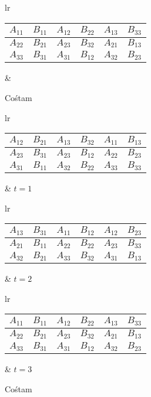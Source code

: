 
\begin{figure}[h]
\centering
\begin{tabular}{lr}
\begin{tabular}{|cc|cc|cc|}
\hline
\(A_{11}\) & \(B_{11}\) & \(A_{12}\) & \(B_{22}\) & \(A_{13}\) & \(B_{33}\) \\
\hline
\(A_{22}\) & \(B_{21}\) & \(A_{23}\) & \(B_{32}\) & \(A_{21}\) & \(B_{13}\) \\
\hline
\(A_{33}\) & \(B_{31}\) & \(A_{31}\) & \(B_{12}\) & \(A_{32}\) & \(B_{23} \) \\
\hline
\end{tabular} &
\hspace{1cm}
\end{tabular}
\caption{Cośtam}
\end{figure}


\begin{figure}[H]
\centering
\begin{tabular}{lr}
\begin{tabular}{|cc|cc|cc|}
\hline
\(A_{12}\) & \(B_{21}\) & \(A_{13}\) & \(B_{32}\) & \(A_{11}\) & \(B_{13}\) \\
\hline
\(A_{23}\) & \(B_{31}\) & \(A_{23}\) & \(B_{12}\) & \(A_{22}\) & \(B_{23}\) \\
\hline
\(A_{31}\) & \(B_{11}\) & \(A_{32}\) & \(B_{22}\) & \(A_{33}\) & \(B_{33} \) \\
\hline
\end{tabular} &
\hspace{1cm}\(t=1\)
\end{tabular}
\vspace{0.5cm}

\begin{tabular}{lr}
\begin{tabular}{|cc|cc|cc|}
\hline
\(A_{13}\) & \(B_{31}\) & \(A_{11}\) & \(B_{12}\) & \(A_{12}\) & \(B_{23}\) \\
\hline
\(A_{21}\) & \(B_{11}\) & \(A_{22}\) & \(B_{22}\) & \(A_{23}\) & \(B_{33}\) \\
\hline
\(A_{32}\) & \(B_{21}\) & \(A_{33}\) & \(B_{32}\) & \(A_{31}\) & \(B_{13} \) \\
\hline
\end{tabular} &
\hspace{1cm}\(t=2\)
\end{tabular}
\vspace{0.5cm}

\begin{tabular}{lr}
\begin{tabular}{|cc|cc|cc|}
\hline
\(A_{11}\) & \(B_{11}\) & \(A_{12}\) & \(B_{22}\) & \(A_{13}\) & \(B_{33}\) \\
\hline
\(A_{22}\) & \(B_{21}\) & \(A_{23}\) & \(B_{32}\) & \(A_{21}\) & \(B_{13}\) \\
\hline
\(A_{33}\) & \(B_{31}\) & \(A_{31}\) & \(B_{12}\) & \(A_{32}\) & \(B_{23} \) \\
\hline
\end{tabular} &
\hspace{1cm}\(t=3\)
\end{tabular}

\caption{Cośtam}
\end{figure}